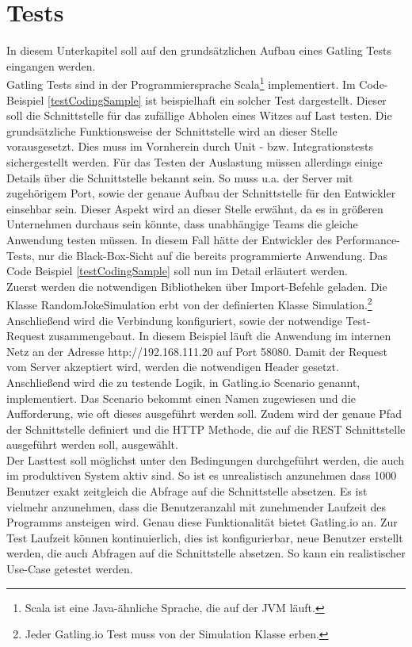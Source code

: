 \section{Tests}
In diesem Unterkapitel soll auf den grundsätzlichen Aufbau eines Gatling Tests eingangen werden.\\
Gatling Tests sind in der Programmiersprache Scala\footnote{{} Scala ist eine Java-ähnliche Sprache, die auf der \ac{JVM} läuft.} implementiert.
Im Code-Beispiel \ref{testCodingSample} ist beispielhaft ein solcher Test dargestellt. Dieser soll die Schnittstelle für das zufällige Abholen eines Witzes auf Last testen. Die grundsätzliche Funktionsweise der Schnittstelle wird an dieser Stelle vorausgesetzt. Dies muss im Vornherein durch Unit - bzw. Integrationstests sichergestellt werden. Für das Testen der Auslastung müssen allerdings einige Details über die Schnittstelle bekannt sein. So muss u.a. der Server mit zugehörigem Port, sowie der genaue Aufbau der Schnittstelle für den Entwickler einsehbar sein. Dieser Aspekt wird an dieser Stelle erwähnt, da es in größeren Unternehmen durchaus sein könnte, dass unabhängige Teams die gleiche Anwendung testen müssen. In diesem Fall hätte der Entwickler des Performance-Tests, nur die Black-Box-Sicht auf die bereits programmierte Anwendung. Das Code Beispiel \ref{testCodingSample} soll nun im Detail erläutert werden.\\
Zuerst werden die notwendigen Bibliotheken über \glqq Import-Befehle\grqq{} geladen. Die Klasse \glqq RandomJokeSimulation\grqq{} erbt von der definierten Klasse \glqq Simulation\grqq{}.\footnote{{} Jeder Gatling.io Test muss von der Simulation Klasse erben.} Anschließend wird die Verbindung konfiguriert, sowie der notwendige Test-Request zusammengebaut. In diesem Beispiel läuft die Anwendung im internen Netz an der Adresse \glqq http://192.168.111.20\grqq{} auf Port 58080. Damit der Request vom Server akzeptiert wird, werden die notwendigen Header gesetzt. \\
Anschließend wird die zu testende Logik, in Gatling.io \glqq Scenario\grqq{} genannt, implementiert. Das Scenario bekommt einen Namen zugewiesen und die Aufforderung, wie oft dieses ausgeführt werden soll. Zudem wird der genaue Pfad der Schnittstelle definiert und die \ac{HTTP} Methode, die auf die \ac{REST} Schnittstelle ausgeführt werden soll, ausgewählt.\\
Der Lasttest soll möglichst unter den Bedingungen durchgeführt werden, die auch im produktiven System aktiv sind. So ist es unrealistisch anzunehmen dass 1000 Benutzer exakt zeitgleich die Abfrage auf die Schnittstelle absetzen. Es ist vielmehr anzunehmen, dass die Benutzeranzahl mit zunehmender Laufzeit des Programms ansteigen wird. Genau diese Funktionalität bietet Gatling.io an. Zur Test Laufzeit können kontinuierlich, dies ist konfigurierbar, neue Benutzer erstellt werden, die auch Abfragen auf die Schnittstelle absetzen. So kann ein realistischer Use-Case getestet werden.\\ 

